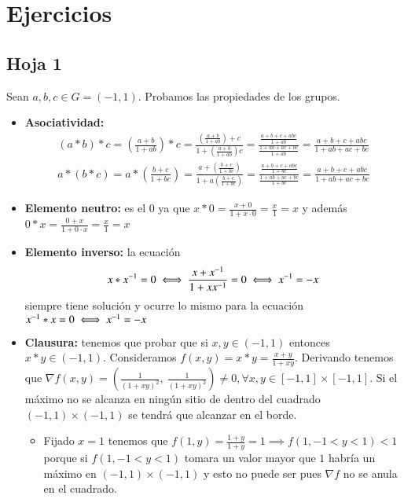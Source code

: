 
\chapter{Ejercicios}

\section{Hoja 1}

\begin{ex}[H1.2]
	Sean $a,b,c \in G = (-1,1)$. Probamos las propiedades de los grupos.
	\begin{itemize}
		\item \textbf{Asociatividad:}
		\begin{align*}
			(a \ast b) \ast c = \left(\frac{a+b}{1+ab}\right) \ast c = \frac{\left(\frac{a+b}{1+ab}\right) + c}{1 + \left(\frac{a+b}{1+ab}\right)c} = \frac{\frac{a+b+c+abc}{1+ab}}{\frac{1+ab+ac+bc}{1+ab}} = \frac{a+b+c+abc}{1+ab+ac+bc} \\
			a \ast (b \ast c) = a \ast \left(\frac{b+c}{1+bc}\right) = \frac{a+\left(\frac{b+c}{1+bc}\right)}{1+a\left(\frac{b+c}{1+bc}\right)} = \frac{\frac{a + b + c + abc}{1+bc}}{\frac{1+ab+ac+bc}{1+bc}} = \frac{a+b+c+abc}{1+ab+ac+bc}
		\end{align*}
		\item \textbf{Elemento neutro:} es el $0$ ya que $x\ast 0 = \frac{x+0}{1+x\cdot 0} = \frac{x}{1} = x$ y además $0 \ast x = \frac{0+x}{1+0\cdot x} = \frac{x}{1} = x$
		\item \textbf{Elemento inverso:} la ecuación
		\begin{align*}
			x \ast x^{-1} = 0 \iff \frac{x + x^{-1}}{1+xx^{-1}} = 0 \iff x^{-1} = -x
		\end{align*}
		siempre tiene solución y ocurre lo mismo para la ecuación $x^{-1} \ast x = 0 \iff x^{-1} = -x$
		\item \textbf{Clausura:} tenemos que probar que si $x,y \in (-1,1)$ entonces $x \ast y \in (-1,1)$. Consideramos $f(x,y) = x \ast y = \frac{x+y}{1+xy}$. Derivando tenemos que $\nabla f(x,y) = (\frac{1}{(1+xy)^2},\ \frac{1}{(1+xy)^2}) \neq 0, \forall x,y \in [-1,1]\times[-1,1]$. Si el máximo no se alcanza en ningún sitio de dentro del cuadrado $(-1,1)\times(-1,1)$ se tendrá que alcanzar en el borde.
		\begin{itemize}
			\item Fijado $x = 1$ tenemos que $f(1,y) = \frac{1+y}{1+y} = 1 \implies f(1, -1 < y < 1) < 1$ porque si $f(1, -1 < y < 1)$ tomara un valor mayor que $1$ habría un máximo en $(-1,1)\times(-1,1)$ y esto no puede ser pues $\nabla f$ no se anula en el cuadrado.

\end{itemize}
\end{itemize}
\end{ex}
